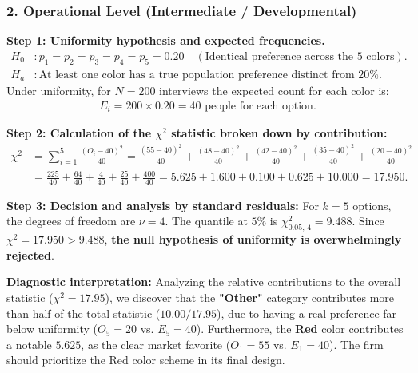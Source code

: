 \subsubsection*{2. Operational Level (Intermediate / Developmental)}

\begin{solproblema}
	\textbf{Step 1: Uniformity hypothesis and expected frequencies.}
	\begin{align}
		H_0&: p_1 = p_2 = p_3 = p_4 = p_5 = 0.20 \quad (\text{Identical preference across the 5 colors}). \\
		H_a&: \text{At least one color has a true population preference distinct from } 20\%.
	\end{align}
	Under uniformity, for $N = 200$ interviews the expected count for each color is:
	\begin{align}
		E_i = 200 \times 0.20 = 40 \text{ people for each option.}
	\end{align}
	
	\textbf{Step 2: Calculation of the $\chi^2$ statistic broken down by contribution:}
	\begin{align}
		\chi^2 &= \sum_{i=1}^5 \frac{(O_i - 40)^2}{40} = \frac{(55-40)^2}{40} + \frac{(48-40)^2}{40} + \frac{(42-40)^2}{40} + \frac{(35-40)^2}{40} + \frac{(20-40)^2}{40} \\
		&= \frac{225}{40} + \frac{64}{40} + \frac{4}{40} + \frac{25}{40} + \frac{400}{40} = 5.625 + 1.600 + 0.100 + 0.625 + 10.000 = 17.950.
	\end{align}
	
	\textbf{Step 3: Decision and analysis by standard residuals:}
	For $k = 5$ options, the degrees of freedom are $\nu = 4$. The quantile at $5\%$ is $\chi^2_{0.05, \, 4} = 9.488$.
	Since $\chi^2 = 17.950 > 9.488$, \textbf{the null hypothesis of uniformity is overwhelmingly rejected}.
	
	\textbf{Diagnostic interpretation:} Analyzing the relative contributions to the overall statistic ($\chi^2 = 17.95$), we discover that the \textbf{"Other"} category contributes more than half of the total statistic ($10.00 / 17.95$), due to having a real preference far below uniformity ($O_5 = 20$ vs. $E_5 = 40$). Furthermore, the \textbf{Red} color contributes a notable $5.625$, as the clear market favorite ($O_1 = 55$ vs. $E_1 = 40$). The firm should prioritize the Red color scheme in its final design.
\end{solproblema}

